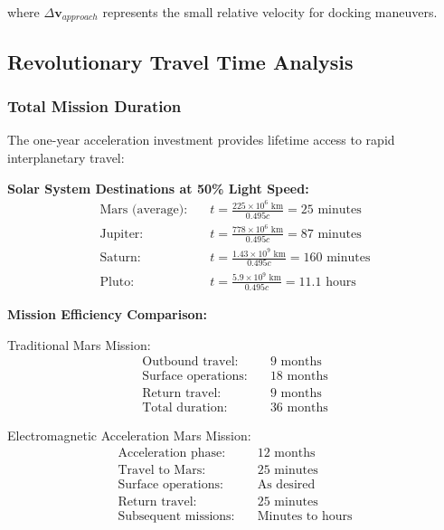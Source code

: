\documentclass[11pt,a4paper]{article}
\theoremstyle{remark}
\begin{document}
where $\Delta\mathbf{v}_{approach}$ represents the small relative velocity for docking maneuvers.

\subsection{Revolutionary Travel Time Analysis}

\subsubsection{Total Mission Duration}

The one-year acceleration investment provides lifetime access to rapid interplanetary travel:

\textbf{Solar System Destinations at 50\% Light Speed:}
\begin{align}
\text{Mars (average):} \quad &t = \frac{225 \times 10^6 \text{ km}}{0.495c} = 25 \text{ minutes} \\
\text{Jupiter:} \quad &t = \frac{778 \times 10^6 \text{ km}}{0.495c} = 87 \text{ minutes} \\
\text{Saturn:} \quad &t = \frac{1.43 \times 10^9 \text{ km}}{0.495c} = 160 \text{ minutes} \\
\text{Pluto:} \quad &t = \frac{5.9 \times 10^9 \text{ km}}{0.495c} = 11.1 \text{ hours}
\end{align}

\textbf{Mission Efficiency Comparison:}

Traditional Mars Mission:
\begin{align}
\text{Outbound travel:} &\quad 9 \text{ months} \\
\text{Surface operations:} &\quad 18 \text{ months} \\
\text{Return travel:} &\quad 9 \text{ months} \\
\text{Total duration:} &\quad 36 \text{ months}
\end{align}

Electromagnetic Acceleration Mars Mission:
\begin{align}
\text{Acceleration phase:} &\quad 12 \text{ months} \\
\text{Travel to Mars:} &\quad 25 \text{ minutes} \\
\text{Surface operations:} &\quad \text{As desired} \\
\text{Return travel:} &\quad 25 \text{ minutes} \\
\text{Subsequent missions:} &\quad \text{Minutes to hours}
\end{align}
\end{document}
